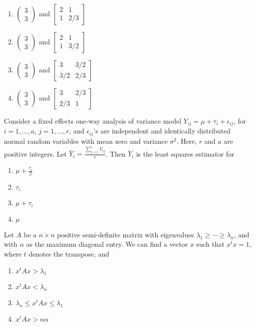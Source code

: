 \begin{enumerate}
    \item $\begin{pmatrix} 3 \\ 3 \end{pmatrix}$ and $\begin{bmatrix} 2 & 1 \\ 1 & 2/3 \end{bmatrix}$
    \item $\begin{pmatrix} 3 \\ 3 \end{pmatrix}$ and $\begin{bmatrix} 2 & 1 \\ 1 & 3/2 \end{bmatrix}$
    \item $\begin{pmatrix} 3 \\ 3 \end{pmatrix}$ and $\begin{bmatrix} 3 & 3/2 \\ 3/2 & 2/3 \end{bmatrix}$
    \item $\begin{pmatrix} 3 \\ 3 \end{pmatrix}$ and $\begin{bmatrix} 3 & 2/3 \\ 2/3 & 1 \end{bmatrix}$
\end{enumerate}
\item Consider a fixed effects one-way analysis of variance model $Y_{ij} = \mu + \tau_i + \epsilon_{ij}$, for $i = 1, \dots, a$, $j = 1, \dots, r$, and $\epsilon_{ij}$'s are independent and identically distributed normal random variables with mean zero and variance $\sigma^2$. Here, $r$ and $a$ are positive integers. Let $\bar{Y}_i = \frac{\sum_{j=1}^r Y_{ij}}{r}$. Then $\bar{Y}_i$ is the least squares estimator for
\begin{enumerate}
    \item $\mu + \frac{\tau_i}{2}$
    \item $\tau_i$
    \item $\mu + \tau_i$
    \item $\mu$
\end{enumerate}
\item Let $A$ be a $n \times n$ positive semi-definite matrix with eigenvalues $\lambda_1 \geq \cdots \geq \lambda_n$, and with $\alpha$ as the maximum diagonal entry. We can find a vector $x$ such that $x^t x = 1$, where $t$ denotes the transpose, and
\begin{enumerate}
    \item $x^t A x > \lambda_1$
    \item $x^t A x < \lambda_n$
    \item $\lambda_n \leq x^t A x \leq \lambda_1$
    \item $x^t A x > n \alpha$
\end{enumerate}

%
